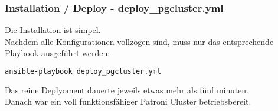 \begin{flushleft}
    \subsubsection{Installation / Deploy - deploy\_pgcluster.yml}
    Die Installation ist simpel.\\
    Nachdem alle Konfigurationen vollzogen sind, muss nur das entsprechende Playbook ausgeführt werden:
    \lstset{style=gra_codestyle}
    \begin{lstlisting}[language=bash, caption=Deploy - deploy\_pgcluster.yml,captionpos=b,label={lst:deploy-pgcluster},breaklines=true]
ansible-playbook deploy_pgcluster.yml
    \end{lstlisting}
    Das reine Deplyoment dauerte jeweils etwas mehr als fünf minuten.\\
    Danach war ein voll funktionsfähiger Patroni Cluster betriebsbereit.

\end{flushleft}
